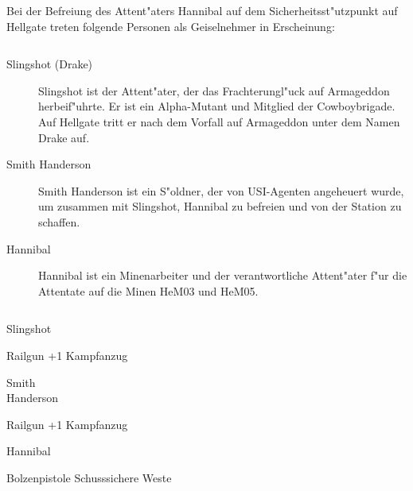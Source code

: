 \newpage
{}

Bei der Befreiung des Attent"aters Hannibal auf dem Sicherheitsst"utzpunkt auf Hellgate treten folgende Personen als Geiselnehmer in Erscheinung:

\begin{column}[l]{0.45}
    \begin{description}
        \item[Slingshot (Drake)] Slingshot ist der Attent"ater, der das Frachterungl"uck auf Armageddon herbeif"uhrte. Er ist ein 
            Alpha-Mutant und Mitglied der Cowboybrigade. Auf Hellgate tritt er nach dem Vorfall auf Armageddon unter dem Namen Drake auf.
        \item[Smith Handerson] Smith Handerson ist ein S"oldner, der von USI-Agenten angeheuert wurde, um zusammen mit Slingshot, Hannibal zu 
            befreien und von der Station zu schaffen.
        \item[Hannibal] Hannibal ist ein Minenarbeiter und der verantwortliche Attent"ater f"ur die Attentate auf die Minen HeM03 und 
            HeM05.
    \end{description}
\end{column}
\begin{column}[r]{0.45}
    \begin{nscsheet}[h]{Slingshot}
        \nscstats[ATT=1,AGG=2,DEX=3]
        \nscruler
        \begin{nscinventory}
            \nscitem[Waffen] Railgun +1
            \nscitem[R"ustung] Kampfanzug
        \end{nscinventory}
    \end{nscsheet}    

    \begin{nscsheet}[h]{Smith\\ Handerson}
        \nscstats[ATT=3,AGG=2]
        \nscruler
        \begin{nscinventory}
            \nscitem[Waffen] Railgun +1
            \nscitem[R"ustung] Kampfanzug
        \end{nscinventory}
    \end{nscsheet}

    \begin{nscsheet}[h]{Hannibal}
        \nscstats[ATT=1,AGG=2,DEX=3,COM=2,CON=2]
        \nscruler
        \begin{nscinventory}
            \nscitem[Waffen] Bolzenpistole
            \nscitem[R"ustung] Schusssichere Weste
        \end{nscinventory}
    \end{nscsheet} 
\end{column}

\newpage
